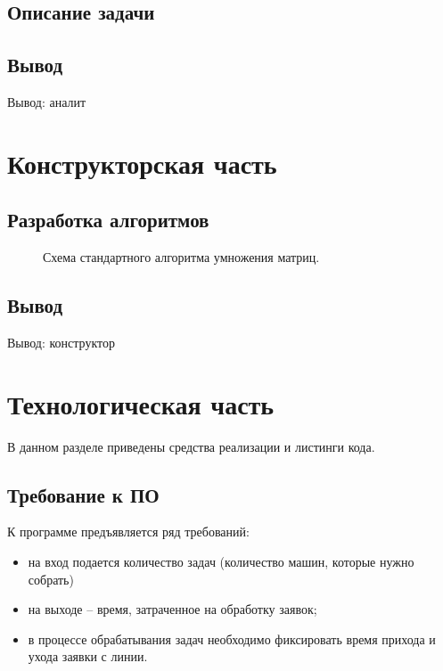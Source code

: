 \documentclass[12pt]{report}
\begin{document}
\section{Описание задачи}

\section*{Вывод}
	Вывод: аналит
\clearpage

\chapter{Конструкторская часть}

\section{Разработка алгоритмов}


\begin{figure}[h]
	\centering
	\caption{Схема стандартного алгоритма умножения матриц.}
	\label{fig:mpr}
\end{figure}



\section*{Вывод}
Вывод: конструктор

\chapter{Технологическая часть}

В данном разделе приведены средства реализации и листинги кода.

\section{Требование к ПО}

К программе предъявляется ряд требований:

\begin{itemize}
	\item на вход подается количество задач (количество машин, которые нужно собрать)
	\item на выходе -- время, затраченное на обработку заявок;
	\item в процессе обрабатывания задач необходимо фиксировать время прихода и ухода заявки с линии.
\end{itemize}
\end{document}

